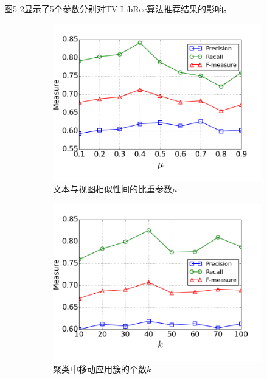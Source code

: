 图5-2显示了5个参数分别对TV-LibRec算法推荐结果的影响。
\begin{figure}
	\centering
	\begin{subfigure}[b]{0.49\textwidth}
		\includegraphics[width=\textwidth]{figures/para_mu}
		\caption{文本与视图相似性间的比重参数$\mu$}
	\end{subfigure}
	\begin{subfigure}[b]{0.49\textwidth}
		\includegraphics[width=\textwidth]{figures/para_k}
		\caption{聚类中移动应用簇的个数$k$}
	\end{subfigure}
	\begin{subfigure}[b]{0.49\textwidth}

\end{subfigure}
\end{figure}

